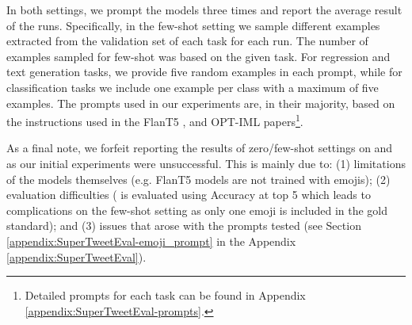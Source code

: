 In both settings, we prompt the models three times and report the average result of the runs. Specifically, in the few-shot setting we sample different examples extracted from the validation set of each task for each run. The number of examples sampled for few-shot was based on the given task. For regression and text generation tasks, we provide five random examples in each prompt, while for classification tasks we include one example per class with a maximum of five examples. The prompts used in our experiments are, in their majority, based on the instructions used in the FlanT5 \cite{chung2024scaling}, and OPT-IML \cite{iyer2023optiml} papers\footnote{Detailed prompts for each task can be found in Appendix \ref{appendix:SuperTweetEval-prompts}.}.

As a final note, we forfeit reporting the results of zero/few-shot settings on {\TweetNER} and {\TweetEmoji} as our initial experiments were unsuccessful. This is mainly due to: (1) limitations of the models themselves (e.g. FlanT5 models are not trained with emojis); (2) evaluation difficulties ({\TweetEmoji} is evaluated using Accuracy at top 5 which leads to complications on the few-shot setting as only one emoji is included in the gold standard); and (3) issues that arose with the prompts tested (see Section \ref{appendix:SuperTweetEval-emoji_prompt} in the Appendix \ref{appendix:SuperTweetEval}).

